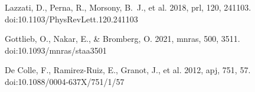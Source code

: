 \documentclass[12pt,a4paper]{book}
\begin{document}
\begin{thebibliography}{20}
 Lazzati, D., Perna, R., Morsony, B.~J., et al. 2018, prl, 120, 241103. doi:10.1103/PhysRevLett.120.241103

 Gottlieb, O., Nakar, E., \& Bromberg, O. 2021, mnras, 500, 3511. doi:10.1093/mnras/staa3501

 De Colle, F., Ramirez-Ruiz, E., Granot, J., et al. 2012, apj, 751, 57. doi:10.1088/0004-637X/751/1/57







\end{thebibliography}
\end{document}
